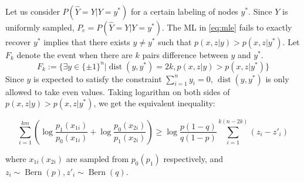 \documentclass[conference,letterpaper]{IEEEtran}
\DeclareMathOperator{\dist}{dist}
\DeclareMathOperator{\Bern}{Bern}
\begin{document}
Let us consider $P(\hat{Y}=Y|Y=y^*)$ for a certain labeling of nodes $y^*$.
Since $Y$ is uniformly sampled, $P_e=P(\hat{Y}=Y|Y=y^*)$.
The ML in \eqref{eq:mle} fails to exactly recover $y^*$ implies that
there exists $y\neq y^*$ such that $p(x,z|y) > p(x,z|y^*)$.
Let $F_k$ denote
the event when there are $k$ pairs difference
between $y$ and $y^*$.
\begin{equation}\label{eq:Fk}
F_k:=\{\exists y \in \{\pm 1\}^n | \dist(y, y^*)=2k, p(x,z|y) > p(x,z|y^*) \}
\end{equation}
Since
$y$ is expected to satisfy the constraint $\sum_{i=1}^n y_i=0$, $\dist(y, y^*)$ is only allowed to take even
values. Taking logarithm on both sides of $p(x,z|y) > p(x,z|y^*)$, we get the equivalent inequality:

\begin{equation}\label{eq:ein}
\sum_{i=1}^{km} (\log \frac{p_1(x_{1i})}{p_0(x_{1i})}
+ \log \frac{p_0(x_{2i})}{p_1(x_{2i})})
\geq \log \frac{p(1-q)}{q(1-p)} \sum_{i=1}^{k(n-2k)}(z_{i} - z'_{i})
\end{equation}

where $x_{1i}(x_{2i})$ are sampled from $p_0(p_1)$ respectively,
and $z_{i} \sim \Bern(p), z'_{i} \sim \Bern(q)$.
\end{document}

